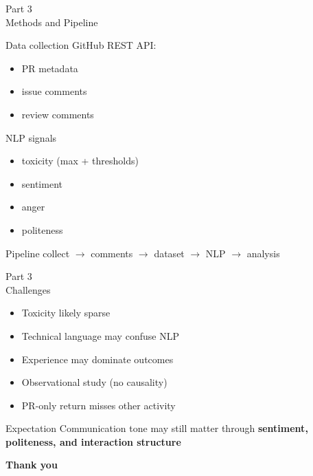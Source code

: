 \documentclass[aspectratio=169,11pt]{beamer}
\begin{document}
\begin{frame}{Part 3\\Methods and Pipeline}

\begin{block}{Data collection}
GitHub REST API:
\begin{itemize}
  \item PR metadata
  \item issue comments
  \item review comments
\end{itemize}
\end{block}

\vspace{0.4em}
\begin{block}{NLP signals}
\begin{itemize}
  \item toxicity (max + thresholds)
  \item sentiment
  \item anger
  \item politeness
\end{itemize}
\end{block}

\vspace{0.4em}
\begin{exampleblock}{Pipeline}
collect $\rightarrow$ comments $\rightarrow$ dataset $\rightarrow$ NLP $\rightarrow$ analysis
\end{exampleblock}

\end{frame}

\begin{frame}{Part 3\\Challenges}

\begin{itemize}
  \item Toxicity likely sparse
  \item Technical language may confuse NLP
  \item Experience may dominate outcomes
  \item Observational study (no causality)
  \item PR-only return misses other activity
\end{itemize}

\vspace{0.6em}
\begin{alertblock}{Expectation}
Communication tone may still matter through
\textbf{sentiment, politeness, and interaction structure}
\end{alertblock}

\end{frame}



\begin{frame}
\vfill
\begin{center}
{\Huge\bfseries Thank you}
\end{center}
\vfill
\end{frame}
\end{document}
